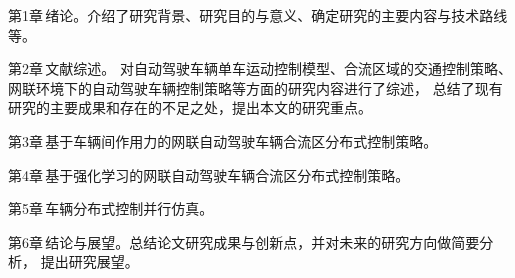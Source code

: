 第1章\,绪论。介绍了研究背景、研究目的与意义、确定研究的主要内容与技术路线等。

第2章\,文献综述。
对自动驾驶车辆单车运动控制模型、合流区域的交通控制策略、
网联环境下的自动驾驶车辆控制策略等方面的研究内容进行了综述，
总结了现有研究的主要成果和存在的不足之处，提出本文的研究重点。

第3章\,基于车辆间作用力的网联自动驾驶车辆合流区分布式控制策略。

第4章\,基于强化学习的网联自动驾驶车辆合流区分布式控制策略。

第5章\,车辆分布式控制并行仿真。

第6章\,结论与展望。总结论文研究成果与创新点，并对未来的研究方向做简要分析，
提出研究展望。




